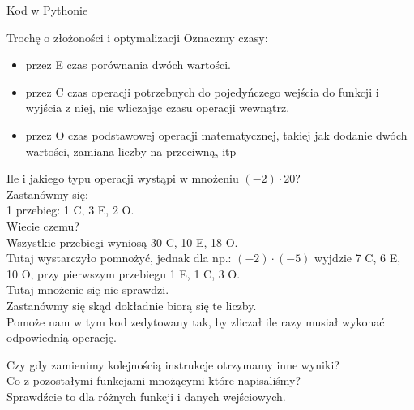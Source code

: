 \begin{frame}{Kod w Pythonie}
    
    
    
\end{frame}
\begin{frame}{Trochę o złożoności i optymalizacji}
    Oznaczmy czasy:
    \begin{itemize}
        \item przez E czas porównania dwóch wartości. \\
        \item przez C czas operacji potrzebnych do pojedyńczego wejścia do funkcji i wyjścia z niej, nie wliczając czasu operacji wewnątrz. \\
        \item przez O czas podstawowej operacji matematycznej, takiej jak dodanie dwóch wartości, zamiana liczby na przeciwną, itp
    \end{itemize}
    Ile i jakiego typu operacji wystąpi w mnożeniu $(-2) \cdot 20$? \\
    Zastanówmy się: \\
    1 przebieg: 1 C, 3 E, 2 O. \\
    Wiecie czemu? \\
    Wszystkie przebiegi wyniosą 30 C, 10 E, 18 O. \\
    Tutaj wystarczyło pomnożyć, jednak dla np.: $(-2) \cdot (-5)$ wyjdzie 7 C, 6 E, 10 O, przy pierwszym przebiegu 1 E, 1 C, 3 O. \\
    Tutaj mnożenie się nie sprawdzi. \\
    Zastanówmy się skąd dokładnie biorą się te liczby. \\
    Pomoże nam w tym kod zedytowany tak, by zliczał ile razy musiał wykonać odpowiednią operację.
    
    Czy gdy zamienimy kolejnością instrukcje otrzymamy inne wyniki? \\
    Co z pozostałymi funkcjami mnożącymi które napisaliśmy? \\
    Sprawdźcie to dla różnych funkcji i danych wejściowych.
\end{frame}

